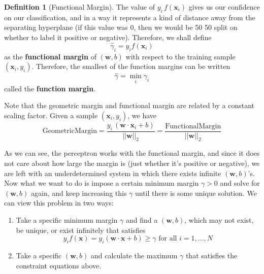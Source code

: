 \documentclass{article}
\theoremstyle{definition}
\newtheorem{definition}{Definition}[section]
\begin{document}
  \begin{definition}[Functional Margin]
    The value of $y_i \, f(\mathbf{x}_i)$ gives us our confidence on our classification, and in a way it represents a kind of distance away from the separating hyperplane (if this value was $0$, then we would be 50 50 split on whether to label it positive or negative). Therefore, we shall define 
    \begin{equation*}
        \hat{\gamma}_i = y_i f(\mathbf{x}_i) 
    \end{equation*}
  as the \textbf{functional margin} of $(\mathbf{w}, b)$ with respect to the training sample $(\mathbf{x}_i, y_i)$. Therefore, the smallest of the function margins can be written 
  \begin{equation*}
      \hat{\gamma} = \min_i \gamma_i 
  \end{equation*}
  called the \textbf{function margin}. 
  \end{definition}

  Note that the geometric margin and functional margin are related by a constant scaling factor. Given a sample $(\mathbf{x}_i, y_i)$, we have 
  \begin{equation*}
      \mathrm{Geometric Margin} = \frac{y_i \, (\mathbf{w} \cdot \mathbf{x}_i + b)}{||\mathbf{w}||_2} = \frac{\mathrm{Functional Margin}}{||\mathbf{w}||_2}
  \end{equation*}

  As we can see, the perceptron works with the functional margin, and since it does not care about how large the margin is (just whether it's positive or negative), we are left with an underdetermined system in which there exists infinite $(\mathbf{w}, b)$'s. Now what we want to do is impose a certain minimum margin $\gamma > 0$ and solve for $(\mathbf{w}, b)$ again, and keep increasing this $\gamma$ until there is some unique solution. We can view this problem in two ways: 
  \begin{enumerate} 
      \item Take a specific minimum margin $\gamma$ and find a $(\mathbf{w}, b)$, which may not exist, be unique, or exist infinitely that satisfies 
          \begin{equation*}
              y_i f(\mathbf{x}) = y_i ( \mathbf{w} \cdot \mathbf{x} + b) \geq \gamma \text{ for all } i = 1, \ldots, N 
          \end{equation*}
      \item Take a specific $(\mathbf{w}, b)$ and calculate the maximum $\gamma$ that satisfies the constraint equations above.  
  \end{enumerate}
\end{document}
